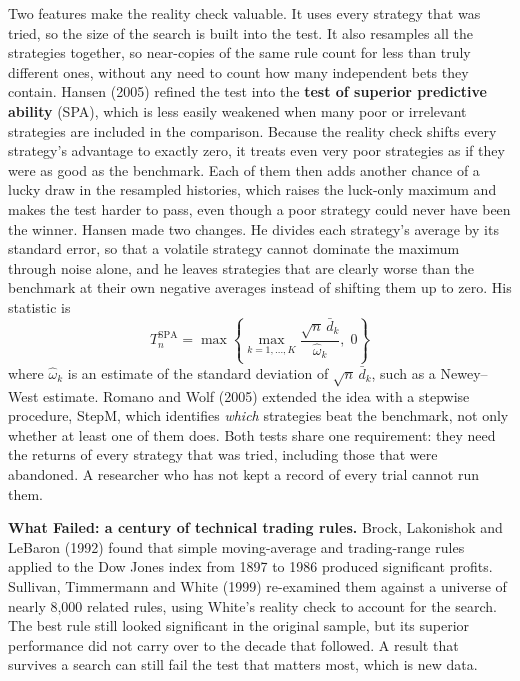 Two features make the reality check valuable. It uses every strategy that was tried, so the size of the search is built into the test. It also resamples all the strategies together, so near-copies of the same rule count for less than truly different ones, without any need to count how many independent bets they contain. Hansen (2005) refined the test into the \textbf{test of superior predictive ability} (SPA), which is less easily weakened when many poor or irrelevant strategies are included in the comparison. Because the reality check shifts every strategy's advantage to exactly zero, it treats even very poor strategies as if they were as good as the benchmark. Each of them then adds another chance of a lucky draw in the resampled histories, which raises the luck-only maximum and makes the test harder to pass, even though a poor strategy could never have been the winner. Hansen made two changes. He divides each strategy's average by its standard error, so that a volatile strategy cannot dominate the maximum through noise alone, and he leaves strategies that are clearly worse than the benchmark at their own negative averages instead of shifting them up to zero. His statistic is
\begin{equation}
  T_n^{\mathrm{SPA}} = \max\left\{ \max_{k = 1, \dots, K} \frac{\sqrt{n}\, \bar{d}_k}{\hat{\omega}_k},\; 0 \right\}
  \label{eq:03-spa}
\end{equation}
where $\hat{\omega}_k$ is an estimate of the standard deviation of $\sqrt{n}\, \bar{d}_k$, such as a Newey--West estimate. Romano and Wolf (2005) extended the idea with a stepwise procedure, StepM, which identifies \emph{which} strategies beat the benchmark, not only whether at least one of them does. Both tests share one requirement: they need the returns of every strategy that was tried, including those that were abandoned. A researcher who has not kept a record of every trial cannot run them.

\begin{callout}
\textbf{What Failed: a century of technical trading rules.} Brock, Lakonishok and LeBaron (1992) found that simple moving-average and trading-range rules applied to the Dow Jones index from 1897 to 1986 produced significant profits. Sullivan, Timmermann and White (1999) re-examined them against a universe of nearly 8,000 related rules, using White's reality check to account for the search. The best rule still looked significant in the original sample, but its superior performance did not carry over to the decade that followed. A result that survives a search can still fail the test that matters most, which is new data.
\end{callout}

